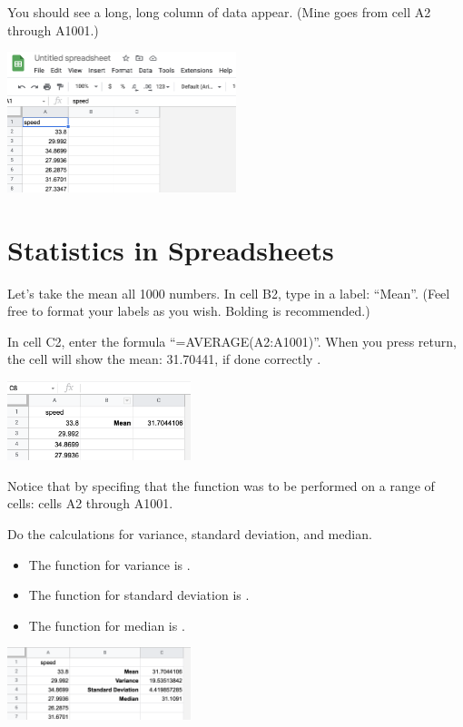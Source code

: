 You should see a long, long column of data appear. (Mine goes from cell A2 through A1001.)

\includegraphics[width=0.5\textwidth]{ImportedCSV.png}

\section{Statistics in Spreadsheets}

Let's take the mean all 1000 numbers.  In cell B2, type in a label:
``Mean''. (Feel free to format your labels as you wish. Bolding is recommended.)

In cell C2, enter the formula ``=AVERAGE(A2:A1001)''. When
you press return, the cell will show the mean: 31.70441, if done correctly .

\includegraphics[width=0.4\textwidth]{Spread_mean.png}

Notice that by specifing that the function  was to
be performed on a range of cells: cells A2 through A1001.

Do the calculations for variance, standard deviation, and median.

\begin{itemize}
\item The function for variance is .
\item The function for standard deviation is .
\item The function for median is .
\end{itemize}

\includegraphics[width=0.4\textwidth]{var_stdev_median.png}

